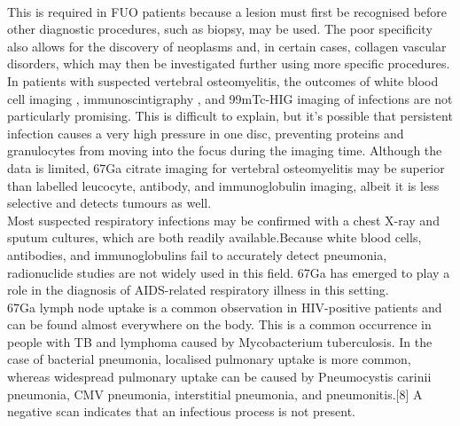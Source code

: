 \documentclass[12pt]{article}
\begin{document}
\\This is required in FUO patients because a lesion must first be recognised before other diagnostic procedures, such as biopsy, may be used. The poor specificity also allows for the discovery of neoplasms and, in certain cases, collagen vascular disorders, which may then be investigated further using more specific procedures.
\\In patients with suspected vertebral osteomyelitis, the outcomes of white blood cell imaging , immunoscintigraphy , and 99mTc-HIG imaging of infections are not particularly promising. This is difficult to explain, but it's possible that persistent infection causes a very high pressure in one disc, preventing proteins and granulocytes from moving into the focus during the imaging time. Although the data is limited, 67Ga citrate imaging for vertebral osteomyelitis may be superior than labelled leucocyte, antibody, and immunoglobulin imaging, albeit it is less selective and detects tumours as well.
\\Most suspected respiratory infections may be confirmed with a chest X-ray and sputum cultures, which are both readily available.Because white blood cells, antibodies, and immunoglobulins fail to accurately detect pneumonia, radionuclide studies are not widely used in this field. 67Ga has emerged to play a role in the diagnosis of AIDS-related respiratory illness in this setting.
\\67Ga lymph node uptake is a common observation in HIV-positive patients and can be found almost everywhere on the body. This is a common occurrence in people with TB and lymphoma caused by Mycobacterium tuberculosis. In the case of bacterial pneumonia, localised pulmonary uptake is more common, whereas widespread pulmonary uptake can be caused by Pneumocystis carinii pneumonia, CMV pneumonia, interstitial pneumonia, and pneumonitis.[8] A negative scan indicates that an infectious process is not present.
\end{document}
